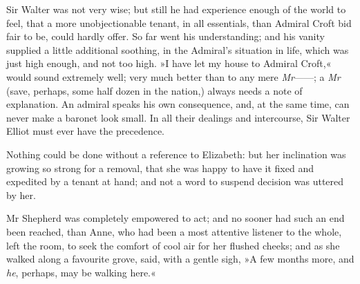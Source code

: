 Sir Walter was not very wise; but still he had experience enough of the world to feel, that a more unobjectionable tenant, in all essentials, than Admiral Croft bid fair to be, could hardly offer. So far went his understanding; and his vanity supplied a little additional soothing, in the Admiral's situation in life, which was just high enough, and not too high. »I have let my house to Admiral Croft,« would sound extremely well; very much better than to any mere \textit{Mr}——; a \textit{Mr} (save, perhaps, some half dozen in the nation,) always needs a note of explanation. An admiral speaks his own consequence, and, at the same time, can never make a baronet look small. In all their dealings and intercourse, Sir Walter Elliot must ever have the precedence.

Nothing could be done without a reference to Elizabeth: but her inclination was growing so strong for a removal, that she was happy to have it fixed and expedited by a tenant at hand; and not a word to suspend decision was uttered by her.

Mr Shepherd was completely empowered to act; and no sooner had such an end been reached, than Anne, who had been a most attentive listener to the whole, left the room, to seek the comfort of cool air for her flushed cheeks; and as she walked along a favourite grove, said, with a gentle sigh, »A few months more, and \textit{he}, perhaps, may be walking here.«